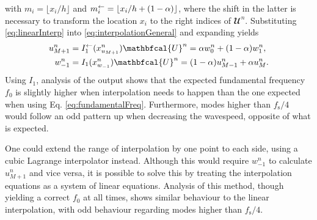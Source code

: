 with $m_i = \lfloor x_i/h\rfloor$ and $m_i^\leftarrow = \lfloor x_i/ h+(1-\alpha) \rfloor$, where the shift in the latter is necessary to transform the location $x_i$ to the right indices of $\mathbfcal{U}^n$. Substituting \eqref{eq:linearInterp} into \eqref{eq:interpolationGeneral} and expanding yields
\begin{subequations}
    \begin{align}
        u_{M+1}^n &= I_1^\flip(x^n_{u_{M+1}})\mathbfcal{U}^n = \alpha w_0^n
        + (1-\alpha)w_1^n,\\
        w_{-1}^n &= I_1(x^n_{w_{-1}})\mathbfcal{U}^n = (1-\alpha)u_{M-1}^n + \alpha u_M^n.
    \end{align}
\end{subequations}
%
Using $I_1$, analysis of the output shows that the expected fundamental frequency $f_0$ is slightly higher when interpolation needs to happen than the one expected when using Eq. \eqref{eq:fundamentalFreq}. Furthermore, modes higher than $f_\text{s} / 4$ would follow an odd pattern up when decreasing the wavespeed, opposite of what is expected. 

One could extend the range of interpolation by one point to each side, using a cubic Lagrange interpolator instead. Although this would require $w_{-1}^n$ to calculate $u_{M+1}^n$ and vice versa, it is possible to solve this by treating the interpolation equations as a system of linear equations. Analysis of this method, though yielding a correct $f_0$ at all times, shows similar behaviour to the linear interpolation, with odd behaviour regarding modes higher than $f_\text{s}/4$.

